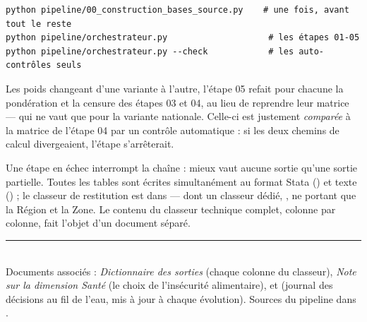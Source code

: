 \documentclass[11pt,a4paper]{article}
\begin{document}
\begin{verbatim}
python pipeline/00_construction_bases_source.py    # une fois, avant tout le reste
python pipeline/orchestrateur.py                    # les étapes 01-05
python pipeline/orchestrateur.py --check            # les auto-contrôles seuls
\end{verbatim}

Les poids changeant d'une variante à l'autre, l'étape 05 refait pour chacune la pondération et la
censure des étapes 03 et 04, au lieu de reprendre leur matrice --- qui ne vaut que pour la
variante nationale. Celle-ci est justement \emph{comparée} à la matrice de l'étape 04 par un
contrôle automatique : si les deux chemins de calcul divergeaient, l'étape s'arrêterait.

Une étape en échec interrompt la chaîne : mieux vaut aucune sortie qu'une sortie partielle. Toutes
les tables sont écrites simultanément au format Stata () et texte
() ; le classeur de restitution est dans  --- dont un
classeur dédié, , ne portant que la Région et la Zone. Le
contenu du classeur technique complet, colonne par colonne, fait l'objet d'un document séparé.

\vfill
\noindent\rule{\linewidth}{0.4pt}\\[2pt]
\small
Documents associés : \emph{Dictionnaire des sorties} (chaque colonne du classeur), \emph{Note sur
la dimension Santé} (le choix de l'insécurité alimentaire), et  (journal des
décisions au fil de l'eau, mis à jour à chaque évolution). Sources du pipeline dans
.
\end{document}
